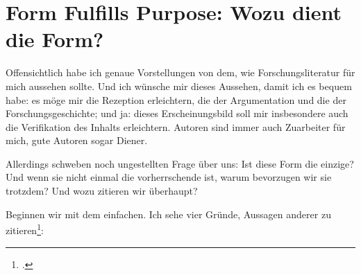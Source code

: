 %
%
%
%
%



\section{Form Fulfills Purpose: Wozu dient die Form?}

Offensichtlich habe ich genaue Vorstellungen von dem, wie Forschungsliteratur
für mich aussehen sollte. Und ich wünsche mir dieses Aussehen, damit ich es
bequem habe: es möge mir die Rezeption erleichtern, die der Argumentation und
die der Forschungsgeschichte; und ja: dieses Erscheinungsbild soll mir
insbesondere auch die Verifikation des Inhalts erleichtern. Autoren sind immer
auch Zuarbeiter für mich, gute Autoren sogar Diener.

Allerdings schweben noch ungestellten Frage über uns: Ist diese Form die
einzige? Und wenn sie nicht einmal die vorherrschende ist, warum bevorzugen wir
sie trotzdem? Und wozu zitieren wir überhaupt?

Beginnen wir mit dem einfachen. Ich sehe vier Gründe, Aussagen anderer zu
zitieren\footcite[vgl. dazu auch][187. Die Autoren beschreiben die
Funktionen ähnlich, legen aber andere Schwer\-punk\-te: So läuft
das, was ich als affirmatives Zitat bezeichnen, bei ihnen als
'Bestätigung wissenschaftlicher Thesen durch anerkannte
Autoritäten oder Arbeiten', während das, was ich als
'konfrontatives Zitat' bezeichne, bei Ihnen nicht vorkommt]{RueStaFra1980a}:

